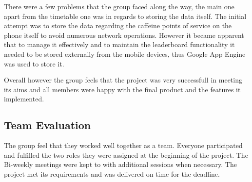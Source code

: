 There were a few problems that the group faced along the way, the main one apart from the timetable one was in regards to storing the data itself. The initial attempt was to store the data regarding the caffeine points of service on the phone itself to avoid numerous network operations. However it became apparent that to manage it effectively and to maintain the leaderboard functionality it needed to be stored externally from the mobile devices, thus Google App Engine was used to store it.  

Overall however the group feels that the project was very successfull in meeting its aims and all members were happy with the final product and the features it implemented.

\subsection{Team Evaluation}
The group feel that they worked well together as a team. Everyone participated and fulfilled the two roles they were assigned at the beginning of the project. The Bi-weekly meetings were kept to with additional sessions when necessary. The project met its requirements and was delivered on time for the deadline. 

